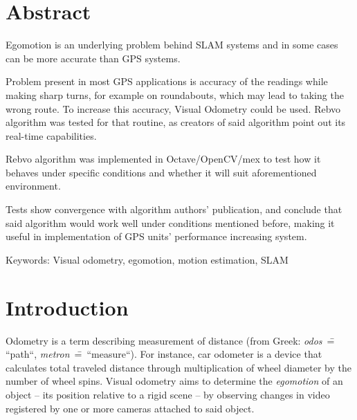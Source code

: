
\chapter*{Abstract}


Egomotion is an underlying problem behind SLAM systems and in some cases can be more accurate than GPS systems.

Problem present in most GPS applications is accuracy of the readings while making sharp turns, for example on roundabouts, which may lead to taking the wrong route. To increase this accuracy, Visual Odometry could be used. Rebvo algorithm was tested for that routine, as creators of said algorithm point out its real-time capabilities.

Rebvo algorithm was implemented in Octave/OpenCV/mex to test how it behaves under specific conditions and whether it will suit aforementioned environment.

Tests show convergence with algorithm authors' publication, and conclude that said algorithm would work well under conditions mentioned before, making it useful in implementation of GPS units' performance increasing system.

Keywords: Visual odometry, egomotion, motion estimation, SLAM

\chapter*{Introduction}


Odometry is a term describing measurement of distance (from Greek: \textit{odos}~\==~ ``path``, \textit{metron}~\==~``measure``). For instance, car odometer is a device that calculates total traveled distance through multiplication of wheel diameter by the number of wheel spins. Visual odometry aims to determine the \textit{egomotion} of an object -- its position relative to a rigid scene -- by observing changes in video registered by one or more cameras attached to said object.

